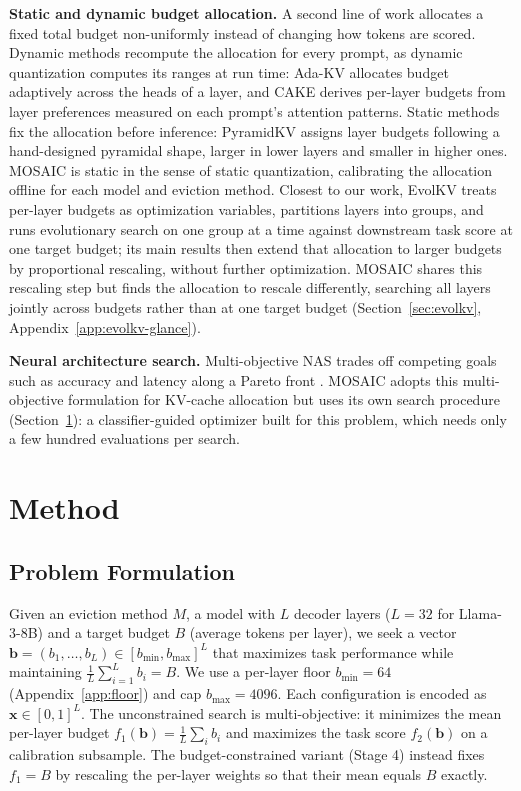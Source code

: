 \documentclass[11pt]{article}
\begin{document}
\textbf{Static and dynamic budget allocation.} A second line of work allocates a fixed total budget non-uniformly instead of changing how tokens are scored. Dynamic methods recompute the allocation for every prompt, as dynamic quantization computes its ranges at run time: Ada-KV \citep{feng2025adakv} allocates budget adaptively across the heads of a layer, and CAKE \citep{qin2025cake} derives per-layer budgets from layer preferences measured on each prompt's attention patterns. Static methods fix the allocation before inference: PyramidKV \citep{cai2025pyramidkv} assigns layer budgets following a hand-designed pyramidal shape, larger in lower layers and smaller in higher ones. MOSAIC is static in the sense of static quantization, calibrating the allocation offline for each model and eviction method. Closest to our work, EvolKV \citep{yu2025evolkv} treats per-layer budgets as optimization variables, partitions layers into groups, and runs evolutionary search on one group at a time against downstream task score at one target budget; its main results then extend that allocation to larger budgets by proportional rescaling, without further optimization. MOSAIC shares this rescaling step but finds the allocation to rescale differently, searching all layers jointly across budgets rather than at one target budget (Section~\ref{sec:evolkv}, Appendix~\ref{app:evolkv-glance}).

\textbf{Neural architecture search.} Multi-objective NAS trades off competing goals such as accuracy and latency along a Pareto front \citep{elsken2018neural}. MOSAIC adopts this multi-objective formulation for KV-cache allocation but uses its own search procedure (Section~\ref{sec:method}): a classifier-guided optimizer built for this problem, which needs only a few hundred evaluations per search.

\section{Method}
\label{sec:method}

\subsection{Problem Formulation}
\label{sec:formulation}

Given an eviction method $M$, a model with $L$ decoder layers ($L = 32$ for Llama-3-8B) and a target budget $B$ (average tokens per layer), we seek a vector $\mathbf{b} = (b_1, \ldots, b_L) \in [b_{\min}, b_{\max}]^L$ that maximizes task performance while maintaining $\frac{1}{L}\sum_{i=1}^{L} b_i = B$. We use a per-layer floor $b_{\min} = 64$ (Appendix~\ref{app:floor}) and cap $b_{\max} = 4096$. Each configuration is encoded as $\mathbf{x} \in [0,1]^L$. The unconstrained search is multi-objective: it minimizes the mean per-layer budget $f_1(\mathbf{b}) = \frac{1}{L}\sum_i b_i$ and maximizes the task score $f_2(\mathbf{b})$ on a calibration subsample. The budget-constrained variant (Stage 4) instead fixes $f_1 = B$ by rescaling the per-layer weights so that their mean equals $B$ exactly.
\end{document}
